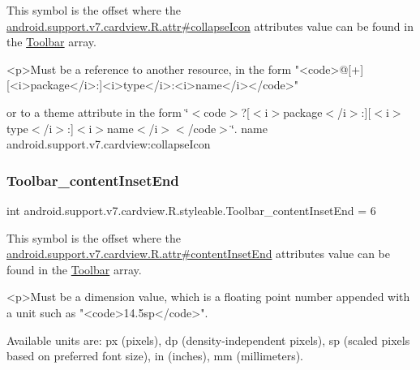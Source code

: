 This symbol is the offset where the \hyperlink{classandroid_1_1support_1_1v7_1_1cardview_1_1R_1_1attr_a0a8e0f7565352fa08daf97a416c9ceea}{android.\+support.\+v7.\+cardview.\+R.\+attr\#collapse\+Icon} attribute\textquotesingle{}s value can be found in the \hyperlink{classandroid_1_1support_1_1v7_1_1cardview_1_1R_1_1styleable_a26149aeb8fd339abe09ecc9d92b9304f}{Toolbar} array.

\begin{DoxyVerb}      <p>Must be a reference to another resource, in the form "<code>@[+][<i>package</i>:]<i>type</i>:<i>name</i></code>"
\end{DoxyVerb}
 or to a theme attribute in the form \char`\"{}$<$code$>$?\mbox{[}$<$i$>$package$<$/i$>$\+:\mbox{]}\mbox{[}$<$i$>$type$<$/i$>$\+:\mbox{]}$<$i$>$name$<$/i$>$$<$/code$>$\char`\"{}.  name android.\+support.\+v7.\+cardview\+:collapse\+Icon \mbox{\label{classandroid_1_1support_1_1v7_1_1cardview_1_1R_1_1styleable_a7b083162c37953ab9198af4e458c5c85}} 
\subsubsection{\texorpdfstring{Toolbar\+\_\+content\+Inset\+End}{Toolbar\_contentInsetEnd}}
{\footnotesize\ttfamily int android.\+support.\+v7.\+cardview.\+R.\+styleable.\+Toolbar\+\_\+content\+Inset\+End = 6\hspace{0.3cm}{\ttfamily [static]}}

This symbol is the offset where the \hyperlink{classandroid_1_1support_1_1v7_1_1cardview_1_1R_1_1attr_a8d34f6f6765a63fc1536f666306ebf8f}{android.\+support.\+v7.\+cardview.\+R.\+attr\#content\+Inset\+End} attribute\textquotesingle{}s value can be found in the \hyperlink{classandroid_1_1support_1_1v7_1_1cardview_1_1R_1_1styleable_a26149aeb8fd339abe09ecc9d92b9304f}{Toolbar} array.

\begin{DoxyVerb}      <p>Must be a dimension value, which is a floating point number appended with a unit such as "<code>14.5sp</code>".
\end{DoxyVerb}
 Available units are\+: px (pixels), dp (density-\/independent pixels), sp (scaled pixels based on preferred font size), in (inches), mm (millimeters). 

